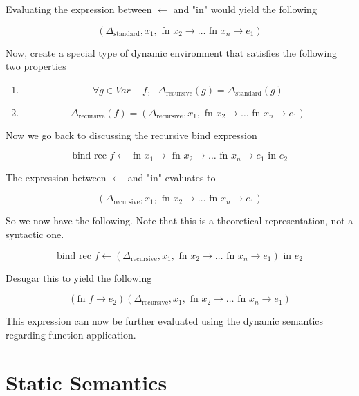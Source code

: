 \documentclass[titlepage]{article}
\begin{document}
Evaluating the expression between $\leftarrow$ and "in" would yield the following

$$(\Delta_{\text{standard}}, x_1, \text{ fn } x_2 \rightarrow \dots \text{ fn } x_n \rightarrow e_1)$$

Now, create a special type of dynamic environment that satisfies the following two properties

\begin{enumerate}
\item $$\forall g \in Var - f, \text{ } \Delta_\text{recursive} (g) = \Delta_\text{standard}(g)$$



\item $$\Delta_\text{recursive}(f) = (\Delta_{\text{recursive}}, x_1, \text{ fn } x_2 \rightarrow \dots \text{ fn } x_n \rightarrow e_1)$$


\end{enumerate}

Now we go back to discussing the recursive bind expression

$$\text{bind rec } f \leftarrow \text{ fn } x_1 \rightarrow \text{ fn } x_2 \rightarrow \dots \text{ fn } x_n \rightarrow e_1 \text{ in } e_2$$

The expression between $\leftarrow$ and "in" evaluates to

$$(\Delta_{\text{recursive}}, x_1, \text{ fn } x_2 \rightarrow \dots \text{ fn } x_n \rightarrow e_1)$$

So we now have the following. Note that this is a theoretical representation, not a syntactic one.

$$\text{bind rec } f \leftarrow (\Delta_{\text{recursive}}, x_1, \text{ fn } x_2 \rightarrow \dots \text{ fn } x_n \rightarrow e_1) \text{ in } e_2$$

Desugar this to yield the following

$$(\text{fn } f \rightarrow e_2) (\Delta_{\text{recursive}}, x_1, \text{ fn } x_2 \rightarrow \dots \text{ fn } x_n \rightarrow e_1)$$

This expression can now be further evaluated using the dynamic semantics regarding function application.

\section{Static Semantics}
\end{document}
